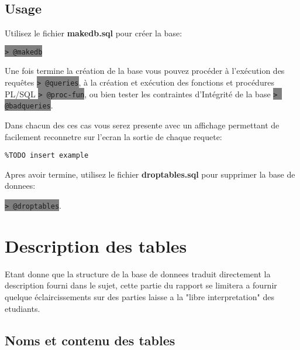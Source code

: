 \documentclass[twoside,openright,a4paper,11pt,french]{article}
\begin{document}
\subsection{Usage}
Utilisez le fichier {\bf makedb.sql} pour créer la base:
\begin{center}
\colorbox{gray}{\lstinline[basicstyle=\ttfamily\color{black}]|> @makedb|}
\end{center}
Une fois termine la création de la base vous pouvez procéder à l'exécution des requêtes
\colorbox{gray}{\lstinline[basicstyle=\ttfamily\color{black}]|> @queries|},
à la création et exécution des fonctions et procédures PL/SQL
\colorbox{gray}{\lstinline[basicstyle=\ttfamily\color{black}]|> @proc-fun|},
ou bien tester les contraintes d'Intégrité de la base
\colorbox{gray}{\lstinline[basicstyle=\ttfamily\color{black}]|> @badqueries|}.

\smallbreak
Dans chacun des ces cas vous serez presente avec un affichage permettant de
facilement reconnetre sur l'ecran la sortie de chaque requete:

\begin{lstlisting}
%TODO insert example
\end{lstlisting}

Apres avoir termine, utilisez le fichier {\bf droptables.sql} pour supprimer
la base de donnees:
\begin{center}
\colorbox{gray}{\lstinline[basicstyle=\ttfamily\color{black}]|> @droptables|}.
\end{center}

\section{Description des tables}
Etant donne que la structure de la base de donnees traduit directement la
description fourni dans le sujet, cette partie du rapport se limitera a fournir
quelque éclaircissements sur des parties laisse a la "libre interpretation" des
etudiants.

\subsection{Noms et contenu des tables}
\end{document}

